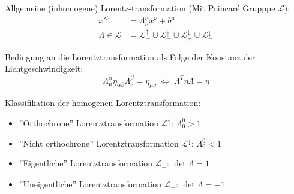 \documentclass[11pt]{article}
\numberwithin{equation}{section}
\begin{document}
          Allgemeine (inhomogene) Lorentz-transformation (Mit Poincaré Grupppe $\mathcal{L}$):
          \begin{equation}
            \begin{aligned}
              x'^\mu &= \Lambda^\mu_{\nu} x^\nu + b^\mu \\
              \Lambda \in \mathcal{L} &= \mathcal{L}^\uparrow_+ \cup \mathcal{L}^\uparrow_- \cup \mathcal{L}^\downarrow_+ \cup \mathcal{L}^\downarrow_-
            \end{aligned}
          \end{equation}

          Bedingung an die Lorentztransformation als Folge der Konstanz der Lichtgeschwindigkeit:
          \begin{equation}
            \Lambda^{\alpha}_{\mu} \eta_{\alpha\beta} \Lambda^{\beta}_{\nu} = \eta_{\mu\nu}
             \;\Leftrightarrow\; \Lambda^T \eta \Lambda = \eta
          \end{equation}

          Klassifikation der homogenen Lorentztransformation:
          \begin{itemize}
            \item ''Orthochrone'' Lorentztransformation $\mathcal{L}^\uparrow$: $\Lambda^0_0 > 1$
            \item ''Nicht orthochrone'' Lorentztransformation $\mathcal{L}^\downarrow$: $\Lambda^0_0 < 1$
            \item ''Eigentliche'' Lorentztransformation $\mathcal{L}_+$: $\det\Lambda = 1$
            \item ''Uneigentliche'' Lorentztransformation $\mathcal{L}_-$: $\det\Lambda = -1$
          \end{itemize}
\end{document}
